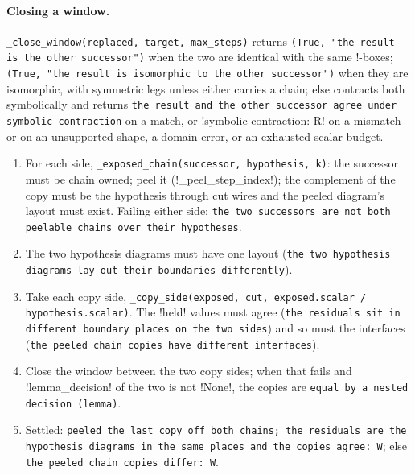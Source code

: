 \paragraph{Closing a window.} \texttt{\_\allowbreak{}close\_\allowbreak{}window(\allowbreak{}replaced,\allowbreak{} target,\allowbreak{} max\_\allowbreak{}steps)} returns \texttt{(\allowbreak{}True,\allowbreak{} "the result is the other successor")} when the two are identical with the same !-boxes; \texttt{(\allowbreak{}True,\allowbreak{} "the result is isomorphic to the other successor")} when they are isomorphic, with symmetric legs unless either carries a chain; else contracts both symbolically and returns \texttt{the result and the other successor agree under symbolic contraction} on a match, or \code!symbolic contraction: R! on a mismatch or on an unsupported shape, a domain error, or an exhausted scalar budget.

\begin{algorithm}\label{alg:kernel-chain-copies}
\begin{enumerate}
\item For each side, \texttt{\_\allowbreak{}exposed\_\allowbreak{}chain(\allowbreak{}successor,\allowbreak{} hypothesis,\allowbreak{} k)}: the successor must be chain owned; peel it (\py!_peel_step_index!); the complement of the copy must be the hypothesis through cut wires and the peeled diagram's layout must exist. Failing either side: \texttt{the two successors are not both peelable chains over their hypotheses}.
\item The two hypothesis diagrams must have one layout (\texttt{the two hypothesis diagrams lay out their boundaries differently}).
\item Take each copy side, \texttt{\_\allowbreak{}copy\_\allowbreak{}side(\allowbreak{}exposed,\allowbreak{} cut,\allowbreak{} exposed.\allowbreak{}scalar / hypothesis.\allowbreak{}scalar)}. The \code!held! values must agree (\texttt{the residuals sit in different boundary places on the two sides}) and so must the interfaces (\texttt{the peeled chain copies have different interfaces}).
\item Close the window between the two copy sides; when that fails and \py!lemma_decision! of the two is not \py!None!, the copies are \texttt{equal by a nested decision (\allowbreak{}lemma)}.
\item Settled: \texttt{peeled the last copy off both chains; the residuals are the hypothesis diagrams in the same places and the copies agree: W}; else \texttt{the peeled chain copies differ: W}.
\end{enumerate}
\end{algorithm}

